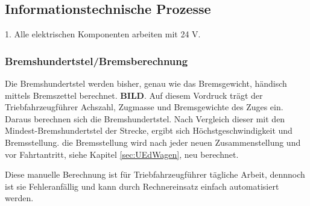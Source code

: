 \subsection{Informationstechnische Prozesse}
1.	Alle elektrischen Komponenten arbeiten mit 24 V.
\subsubsection{Bremshundertstel/Bremsberechnung}
Die Bremshundertstel werden bisher, genau wie das Bremsgewicht, händisch mittels Bremszettel berechnet. \textbf{BILD}. Auf diesem Vordruck trägt der Triebfahrzeugführer Achszahl, Zugmasse und Bremsgewichte des Zuges ein. Daraus berechnen sich die Bremshundertstel. Nach Vergleich dieser mit den Mindest-Bremshundertstel der Strecke, ergibt sich Höchstgeschwindigkeit und Bremsstellung. die Bremsstellung wird nach jeder neuen Zusammenstellung und vor Fahrtantritt, siehe Kapitel \ref{sec:UEdWagen}, neu berechnet.\par
Diese manuelle Berechnung ist für Triebfahrzeugführer tägliche Arbeit, dennnoch ist sie Fehleranfällig und kann durch Rechnereinsatz einfach automatisiert werden.
